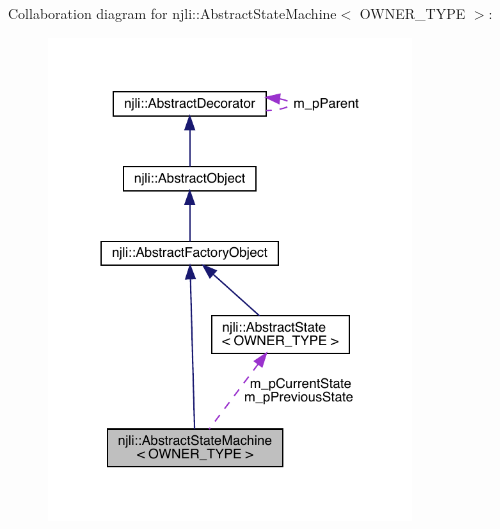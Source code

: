 Collaboration diagram for njli\+:\+:Abstract\+State\+Machine$<$ O\+W\+N\+E\+R\+\_\+\+T\+Y\+PE $>$\+:\nopagebreak
\begin{figure}[H]
\begin{center}
\leavevmode
\includegraphics[width=273pt]{classnjli_1_1_abstract_state_machine__coll__graph}
\end{center}
\end{figure}
